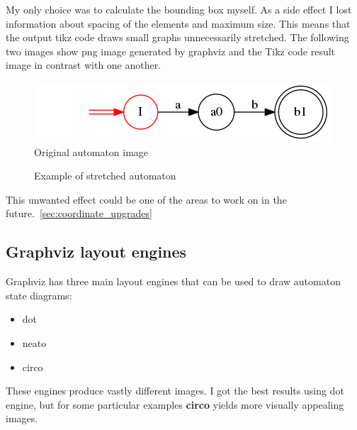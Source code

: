 \documentclass{ctuthesis}
\begin{document}
My only choice was to calculate the bounding box myself. As a side effect I lost information about spacing of the elements and maximum size. This means that the output tikz code draws small graphs unnecessarily stretched. The following two images show png image generated by graphviz and the Tikz code result image in contrast with one another. 

\begin{figure}[H]
\includegraphics[width=0.5\linewidth]{figures/not_stretched.png}
\caption{Original automaton image}
\label{fig:not_stretched_automaton}
\end{figure}

\begin{figure}[H]
\caption{Example of stretched automaton}
\label{fig:stretched_automaton}
\end{figure}

This unwanted effect could be one of the areas to work on in the future.~\ref{sec:coordinate_upgrades}

\subsection{Graphviz layout engines}
Graphviz has three main layout engines that can be used to draw automaton state diagrams:
\begin{itemize}
	\item dot
	\item neato
	\item circo
\end{itemize}

These engines produce vastly different images. I got the best results using dot engine, but for some particular examples \textbf{circo} yields more visually appealing images. 
\end{document}
